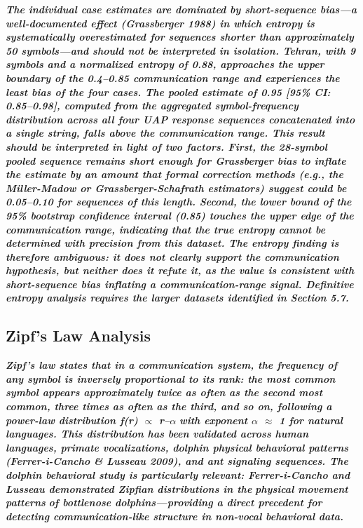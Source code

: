 \documentclass[11pt,letterpaper]{article}
\begin{document}
\textbf{\textit{The individual case estimates are dominated by short-sequence bias---a well-documented effect (Grassberger 1988) in which entropy is systematically overestimated for sequences shorter than approximately 50 symbols---and should not be interpreted in isolation. Tehran, with 9 symbols and a normalized entropy of 0.88, approaches the upper boundary of the 0.4--0.85 communication range and experiences the least bias of the four cases. The pooled estimate of 0.95 [95\% CI: 0.85--0.98], computed from the aggregated symbol-frequency distribution across all four UAP response sequences concatenated into a single string, falls above the communication range. This result should be interpreted in light of two factors. First, the 28-symbol pooled sequence remains short enough for Grassberger bias to inflate the estimate by an amount that formal correction methods (e.g., the Miller-Madow or Grassberger-Schafrath estimators) suggest could be 0.05--0.10 for sequences of this length. Second, the lower bound of the 95\% bootstrap confidence interval (0.85) touches the upper edge of the communication range, indicating that the true entropy cannot be determined with precision from this dataset. The entropy finding is therefore ambiguous: it does not clearly support the communication hypothesis, but neither does it refute it, as the value is consistent with short-sequence bias inflating a communication-range signal. Definitive entropy analysis requires the larger datasets identified in Section 5.7.}}


\subsection{Zipf's Law Analysis}

\textbf{\textit{Zipf's law states that in a communication system, the frequency of any symbol is inversely proportional to its rank: the most common symbol appears approximately twice as often as the second most common, three times as often as the third, and so on, following a power-law distribution f(r) $\propto$ r}}\textbf{\textit{--$\alpha$}}\textbf{\textit{ with exponent $\alpha$ $\approx$ 1 for natural languages. This distribution has been validated across human languages, primate vocalizations, dolphin physical behavioral patterns (Ferrer-i-Cancho \& Lusseau 2009), and ant signaling sequences. The dolphin behavioral study is particularly relevant: Ferrer-i-Cancho and Lusseau demonstrated Zipfian distributions in the }}\textbf{\textit{physical movement patterns}}\textbf{\textit{ of bottlenose dolphins---providing a direct precedent for detecting communication-like structure in non-vocal behavioral data.}}
\end{document}
